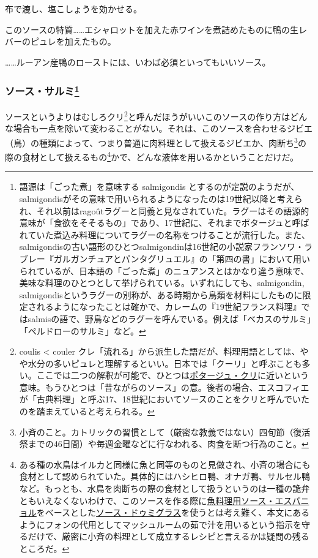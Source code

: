 \begin{recette}
布で漉し、塩こしょうを効かせる。

このソースの特質\ldots{}\ldots{}エシャロットを加えた赤ワインを煮詰めたものに鴨の生レバーのピュレを加えたもの。

\ldots{}\ldots{}ルーアン産鴨のローストには、いわば必須といってもいいソース。

\atoaki{}

\hypertarget{sauce-salmis}{%
\subsubsection[ソース・サルミ]{\texorpdfstring{ソース・サルミ\footnote{語源は「ごった煮」を意味する
  salmigondis
  とするのが定説のようだが、salmigondisがその意味で用いられるようになったのは19世紀以降と考えられ、それ以前はragoûtラグーと同義と見なされていた。ラグーはその語源的意味が「食欲をそそるもの」であり、17世紀に、それまでポタージュと呼ばれていた煮込み料理についてラグーの名称をつけることが流行した。また、salmigondisの古い語形のひとつsalmigondinは16世紀の小説家フランソワ・ラブレー『ガルガンチュアとパンタグリュエル』の「第四の書」において用いられているが、日本語の「ごった煮」のニュアンスとはかなり違う意味で、美味な料理のひとつとして挙げられている。いずれにしても、salmigondin,
  salmigondisというラグーの別称が、ある時期から鳥類を材料にしたものに限定されるようになったことは確かで、カレームの『19世紀フランス料理』ではsalmisの語で、野鳥などのラグーを呼んでいる。例えば「ベカスのサルミ」「ペルドローのサルミ」など。}}{ソース・サルミ}}\label{sauce-salmis}}


 

ソースというよりはむしろクリ\footnote{coulis \textless{} couler
  クレ「流れる」から派生した語だが、料理用語としては、やや水分の多いピュレと理解するといい。日本では「クーリ」と呼ぶことも多い。ここでは二つの解釈が可能で、ひとつは\protect\hyperlink{}{ポタージュ・クリ}に近いという意味。もうひとつは「昔ながらのソース」の意。後者の場合、エスコフィエが「古典料理」と呼ぶ17、18世紀においてソースのことをクリと呼んでいたのを踏まえていると考えられる。}と呼んだほうがいいこのソースの作り方はどんな場合も一点を除いて変わることがない。それは、このソースを合わせるジビエ（鳥）の種類によって、つまり普通に肉料理として扱えるジビエか、肉断ち\footnote{小斉のこと。カトリックの習慣として（厳密な教義ではない）四旬節（復活祭までの46日間）や毎週金曜などに行なわれる、肉食を断つ行為のこと。}の際の食材として扱えるもの\footnote{ある種の水鳥はイルカと同様に魚と同等のものと見做され、小斉の場合にも食材として認められていた。具体的にはハシヒロ鴨、オナガ鴨、サルセル鴨など。もっとも、水鳥を肉断ちの際の食材として扱うというのは一種の詭弁ともいえなくないわけで、このソースを作る際に\protect\hyperlink{sauce-espagnole-maigre}{魚料理用ソース・エスパニョル}をベースとした\protect\hyperlink{sauce-demi-glace}{ソース・ドゥミグラス}を使うとは考え難く、本文にあるようにフォンの代用としてマッシュルームの茹で汁を用いるという指示を守るだけで、厳密に小斉の料理として成立するレシピと言えるかは疑問の残るところだ。}かで、どんな液体を用いるかということだけだ。


\end{recette}

